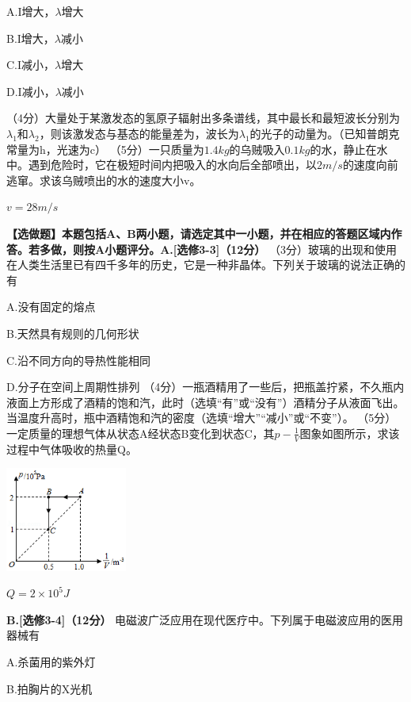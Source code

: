 A.I增大，$\lambda$增大

B.I增大，$\lambda$减小	

C.I减小，$\lambda$增大	

D.I减小，$\lambda$减小

\question[6] （4分）大量处于某激发态的氢原子辐射出多条谱线，其中最长和最短波长分别为$\lambda_{1}$和$\lambda_{2}$，则该激发态与基态的能量差为，波长为$\lambda_{1}$的光子的动量为。（已知普朗克常量为h，光速为c）
\question[6] （5分）一只质量为$1.4kg$的乌贼吸入$0.1kg$的水，静止在水中。遇到危险时，它在极短时间内把吸入的水向后全部喷出，以$2m/s$的速度向前逃窜。求该乌贼喷出的水的速度大小v。
\begin{solution}{4cm}
    $v=28m/s$
\end{solution}
\textbf{【选做题】本题包括A、B两小题，请选定其中一小题，并在相应的答题区域内作答。若多做，则按A小题评分。A.[选修3-3]（12分）}
\question[6] （3分）玻璃的出现和使用在人类生活里已有四千多年的历史，它是一种非晶体。下列关于玻璃的说法正确的有

A.没有固定的熔点

B.天然具有规则的几何形状	

C.沿不同方向的导热性能相同

D.分子在空间上周期性排列
\question[6] （4分）一瓶酒精用了一些后，把瓶盖拧紧，不久瓶内液面上方形成了酒精的饱和汽，此时（选填“有”或“没有”）酒精分子从液面飞出。当温度升高时，瓶中酒精饱和汽的密度（选填“增大”“减小”或“不变”）。
\question[6] （5分）一定质量的理想气体从状态A经状态B变化到状态C，其$p-\frac{1}{V}$图象如图所示，求该过程中气体吸收的热量Q。\begin{center}\includegraphics[width=4cm]{img/image13.png}\end{center}
\begin{solution}{4cm}
    $Q=2\times 10^5J$
\end{solution}

\newpage
\textbf{B.[选修3-4]（12分）}
\question[6] 电磁波广泛应用在现代医疗中。下列属于电磁波应用的医用器械有

A.杀菌用的紫外灯

B.拍胸片的X光机

